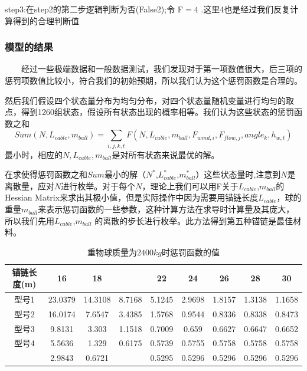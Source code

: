 \documentclass[a4paper,12pt]{ctexart}
\begin{document}
   step3:在step2的第二步逻辑判断为否(False2);令 F$=4$ .这里4也是经过我们反复计算得到的合理判断值\\

\subsubsection{模型的结果}

~~~~经过一些极端数据和一般数据测试，我们发现对于第一项数值很大，后三项的惩罚项数值比较小，符合我们的初始预期，所以我们认为这个惩罚函数是合理的。

	然后我们假设四个状态量分布为均匀分布，对四个状态量随机变量进行均匀的取点，得到1260组状态，假设所有状态出现的概率相等。我们认为这些状态的惩罚函数之和
\[Sum(N,L_{cable},m_{ball})=\sum_{i,j,k,t} F(N,L_{cable},m_{ball},F_{wind,i},F_{flow,j},angle_{k},h_{w,t})\]
最小时，相应的$N,L_{cable},m_{ball}$是对所有状态来说最优的解。

在求使得惩罚函数之和$Sum$最小的解（$N^*$,$L_{cable}^*$,$m_{ball}^*$）这些状态量时,注意到$N$是离散量，应对$N$进行枚举。对于每个$N$，理论上我们可以用F关于$L_{cable}$,$m_{ball}$的Hessian Matrix来求出其极小值，但是实际操作中因为需要用锚链长度$L_{cable}$，球的重量$m_{ball}$来表示惩罚函数的一些参数，这种计算方法在求导时计算量及其庞大，所以我们先用$L_{cable}$,$m_{ball}$ 的离散的步长进行枚举。此方法得到第五种锚链是最佳材料。

\begin{center}
\begin{table}[!ht]
\begin{tabular}{ccccccccc}
  \hline \hline
锚链长度(m)	&	16	&	18	&	{\color{red}{20}}	&	22	&	24	&	26	&	28	&	30	\\ \hline
型号1	&	23.0379	&	14.3108	&	8.7168	&	5.1245	&	2.9698	&	1.8157	&	1.3138	&	1.1658	\\
型号2	&	16.0174	&	7.6547	&	3.4385	&	1.5768	&	0.9544	&	0.8336	&	0.8338	&	0.8473	\\
型号3	&	9.8131	&	3.303	&	1.1518	&	0.7009	&	0.659	&	0.6627	&	0.6647	&	0.6652	\\
型号4	&	5.5636	&	1.329	&	0.6175	&	0.5739	&	0.5755	&	0.5758	&	0.5758	&	0.5758	\\
{\color{red}{型号5}}	&	2.9843	&	0.6721	&	{\color{red}{0.5286}} 	&	0.5295	&	0.5296	&	0.5296	&	0.5296	&	0.5296	\\
  \hline \hline
\end{tabular}
 \caption{重物球质量为$2400kg$时惩罚函数的值}
\end{table}
\end{center}
\end{document}
